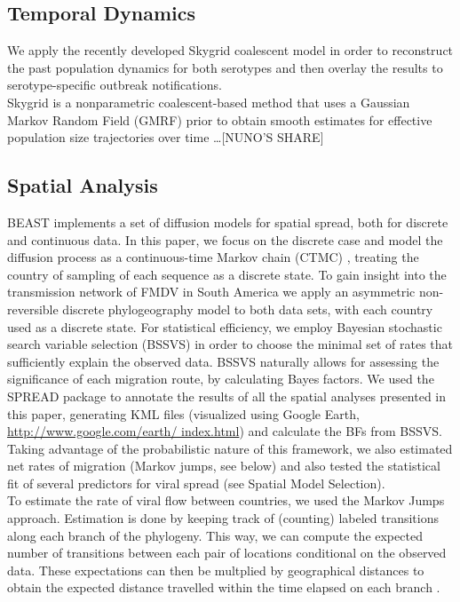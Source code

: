 \documentclass[10pt]{article}
\begin{document}
\subsection{Temporal Dynamics}
\indent We apply the recently developed Skygrid coalescent model \cite{skygrid} in order to reconstruct the past population dynamics for both serotypes and then overlay the results to serotype-specific outbreak notifications.\\
\indent Skygrid is a nonparametric coalescent-based method that uses a Gaussian Markov Random Field (GMRF) prior to obtain smooth estimates for effective population size trajectories over time \ldots [NUNO'S SHARE]
\subsection{Spatial Analysis}
\indent BEAST \cite{BEAST} implements a set of diffusion models for spatial spread, both for discrete and continuous data. In this paper, we focus on the discrete case and model the diffusion process as a continuous-time Markov chain (CTMC) \cite{roots}, treating the country of sampling of each sequence as a discrete state. To gain insight into the transmission network of FMDV in South America we apply an asymmetric non-reversible discrete phylogeography model to both data sets, with each country used as a discrete state. For statistical efficiency, we employ Bayesian stochastic search variable selection (BSSVS) in order to choose the minimal set of rates that sufficiently explain the observed data. BSSVS naturally allows for assessing the significance of each migration route, by calculating Bayes factors. We used the SPREAD \cite{spread} package to annotate the results of all the spatial analyses presented in this paper, generating KML files (visualized using Google Earth, \url{http://www.google.com/earth/
index.html}) and calculate the BFs from BSSVS.\\
\indent Taking advantage of the probabilistic nature of this framework, we also estimated net rates of migration (Markov jumps, see below) and also tested the statistical fit of several predictors for viral spread (see Spatial Model Selection).\\
\indent To estimate the rate of viral flow between countries, we used the Markov Jumps \cite{Minin2008} approach. Estimation is done by keeping track of (counting) labeled transitions along each branch of the phylogeny. This way, we can compute the expected number of transitions between each pair of locations conditional on the observed data. These expectations can then be multplied by geographical distances to obtain the expected distance travelled within the time elapsed on each branch \cite{zoonotic}.\\
\end{document}
